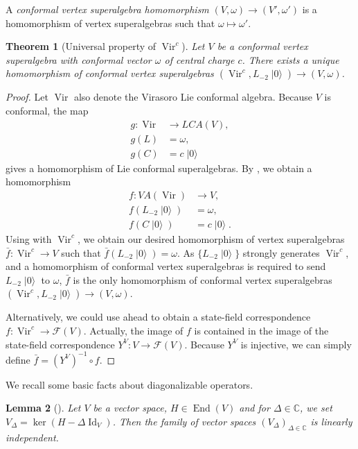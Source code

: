 \documentclass[a4paper, 12pt, reqno]{amsart}
\newtheorem{theorem}{Theorem}[section]
\newtheorem{lemma}[theorem]{Lemma}
\theoremstyle{remark}
\numberwithin{equation}{subsection}
\DeclareMathOperator{\Vir}{Vir}
\DeclareMathOperator{\Id}{Id}
\DeclareMathOperator{\End}{End}
\DeclareMathOperator{\vac}{|0\rangle}
\begin{document}
A \emph{conformal vertex superalgebra homomorphism} $(V, \omega) \to (V', \omega')$ is a homomorphism of vertex superalgebras such that $\omega \mapsto \omega'$.

\begin{theorem}[Universal property of $\Vir^c$]
  \label{thr:22}
  Let $V$ be a conformal vertex superalgebra with conformal vector $\omega$ of central charge $c$.
  There exists a unique homomorphism of conformal vertex superalgebras $(\Vir^c, L_{-2}\vac) \to (V, \omega)$.
\end{theorem}

\begin{proof}
  Let $\Vir$ also denote the Virasoro Lie conformal algebra.
  Because $V$ is conformal, the map
  \begin{align*}
    g: \Vir &\to LCA(V), \\
    g(L) &= \omega, \\
    g(C) &= c\vac
  \end{align*}
  gives a homomorphism of Lie conformal superalgebras.
  By , we obtain a homomorphism
  \begin{align*}
    f: VA(\Vir) &\to V, \\
    f(L_{-2}\vac) &= \omega, \\
    f(C\vac) &= c\vac.
  \end{align*}
  Using  with $\Vir^c$, we obtain our desired homomorphism of vertex superalgebras $\bar{f}: \Vir^c \to V$ such that $\bar{f}(L_{-2}\vac) = \omega$.
  As $\{L_{-2}\vac\}$ strongly generates $\Vir^c$, and a homomorphism of conformal vertex superalgebras is required to send $L_{-2}\vac$ to $\omega$, $\bar{f}$ is the only homomorphism of conformal vertex superalgebras $(\Vir^c, L_{-2}\vac) \to (V, \omega)$.

  Alternatively, we could use  ahead to obtain a state-field correspondence $f: \Vir^c \to \mathcal{F}(V)$.
  Actually, the image of $f$ is contained in the image of the state-field correspondence $Y^V: V \to \mathcal{F}(V)$.
  Because $Y^V$ is injective, we can simply define $\bar{f} = (Y^V)^{-1}\circ f$.
\end{proof}

We recall some basic facts about diagonalizable operators.

\begin{lemma}[{\cite[\S6.2]{hoffman_linear_1971}}]
  \label{lmm:8}
  Let $V$ be a vector space, $H \in \End(V)$ and for $\Delta \in \mathbb{C}$, we set $V_{\Delta} = \ker(H - \Delta\Id_V)$.
  Then the family of vector spaces $(V_{\Delta})_{\Delta \in \mathbb{C}}$ is linearly independent.
\end{lemma}
\end{document}
